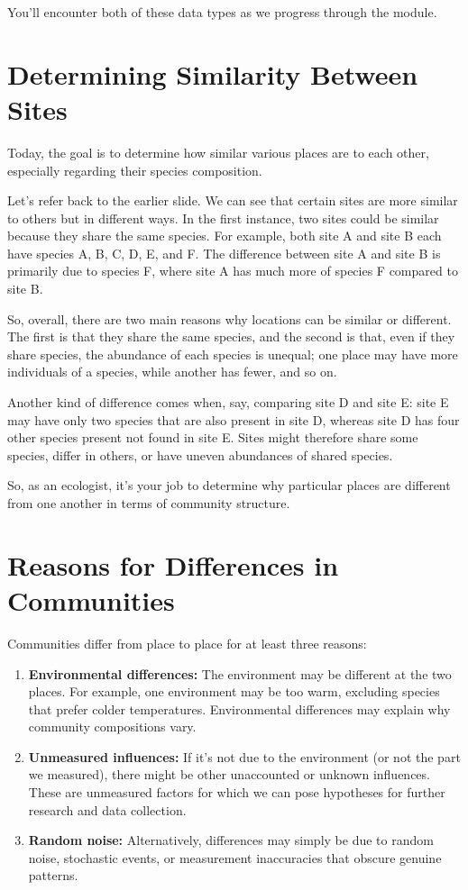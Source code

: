 \documentclass[
  12pt,
]{book}
\begin{document}
You'll encounter both of these data types as we progress through the
module.

\section{Determining Similarity Between
Sites}\label{determining-similarity-between-sites}

Today, the goal is to determine how similar various places are to each
other, especially regarding their species composition.

Let's refer back to the earlier slide. We can see that certain sites are
more similar to others but in different ways. In the first instance, two
sites could be similar because they share the same species. For example,
both site A and site B each have species A, B, C, D, E, and F. The
difference between site A and site B is primarily due to species F,
where site A has much more of species F compared to site B.

So, overall, there are two main reasons why locations can be similar or
different. The first is that they share the same species, and the second
is that, even if they share species, the abundance of each species is
unequal; one place may have more individuals of a species, while another
has fewer, and so on.

Another kind of difference comes when, say, comparing site D and site E:
site E may have only two species that are also present in site D,
whereas site D has four other species present not found in site E. Sites
might therefore share some species, differ in others, or have uneven
abundances of shared species.

So, as an ecologist, it's your job to determine why particular places
are different from one another in terms of community structure.

\section{Reasons for Differences in
Communities}\label{reasons-for-differences-in-communities}

Communities differ from place to place for at least three reasons:

\begin{enumerate}
\def\labelenumi{\arabic{enumi}.}
\item
  \textbf{Environmental differences:} The environment may be different
  at the two places. For example, one environment may be too warm,
  excluding species that prefer colder temperatures. Environmental
  differences may explain why community compositions vary.
\item
  \textbf{Unmeasured influences:} If it's not due to the environment (or
  not the part we measured), there might be other unaccounted or unknown
  influences. These are unmeasured factors for which we can pose
  hypotheses for further research and data collection.
\item
  \textbf{Random noise:} Alternatively, differences may simply be due to
  random noise, stochastic events, or measurement inaccuracies that
  obscure genuine patterns.
\end{enumerate}
\end{document}

